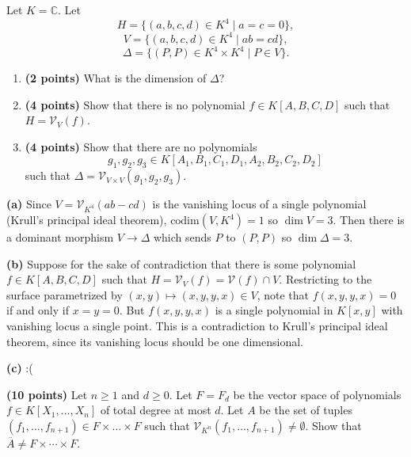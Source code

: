 \documentclass[11pt,letterpaper]{article}
\begin{document}
\begin{problem}
    Let $K=\mathbb C$. Let
    \[
        H = \{(a,b,c,d) \in K^4 \mid a=c=0\},
    \]
    \[
        V = \{(a,b,c,d)\in K^4 \mid ab=cd\},
    \]
    \[
        \Delta = \{(P,P)\in K^4\times K^4 \mid P \in V\}.
    \]
    \begin{enumerate}[label=(\alph*)]
        \item \textbf{(2 points)} What is the dimension of $\Delta$?
        \item \textbf{(4 points)} Show that there is no polynomial $f\in K[A,B,C,D]$ such that $H = \mathcal V_V(f)$.
        \item \textbf{(4 points)} Show that there are no polynomials
            \[g_1,g_2,g_3\in K[A_1,B_1,C_1,D_1,A_2,B_2,C_2,D_2]\]
        such that $\Delta = \mathcal V_{V\times V}(g_1,g_2,g_3)$.
    \end{enumerate}
\end{problem}

\begin{solution}
    \textbf{(a)} Since $V=\mathcal{V}_{K^4}(ab-cd)$ is the vanishing locus of a single polynomial (Krull's principal ideal theorem), $\textrm{codim}(V, K^4)=1$ so $\dim V=3$. Then there is a dominant morphism  $V \to \Delta$ which sends $P$ to $(P,P)$ so $\dim \Delta = 3$.

    \textbf{(b)} Suppose for the sake of contradiction that there is some polynomial $f\in K[A,B,C,D]$ such that $H = \mathcal{V}_V(f) = \mathcal{V}(f)\cap V$. Restricting to the surface parametrized by  $(x,y)\mapsto (x,y,y,x)\in V$, note that $f(x,y,y,x)=0$ if and only if $x=y=0$. But $f(x,y,y,x)$ is a single polynomial in $K[x,y]$ with vanishing locus a single point. This is a contradiction to Krull's principal ideal theorem, since its vanishing locus should be one dimensional.

    \textbf{(c)} :(
\end{solution}

\begin{problem}
    \textbf{(10 points)} Let $n\geq1$ and $d\geq0$. Let $F=F_d$ be the vector space of polynomials $f\in K[X_1,\dots,X_n]$ of total degree at most $d$. Let $A$ be the set of tuples $(f_1,\dots,f_{n+1})\in F\times\dots\times F$ such that $\mathcal V_{K^n}(f_1,\dots,f_{n+1})\neq\emptyset$. Show that $\overline{A}\neq F\times\cdots\times F$.
\end{problem}
\end{document}
